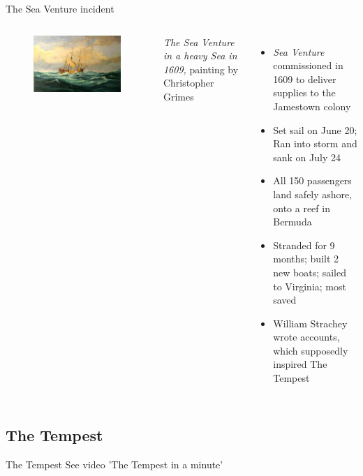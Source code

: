 \documentclass{beamer}
\begin{document}
\begin{frame}{The Sea Venture incident}
  \begin{columns}[c]
    \begin{figure}[htp]
      \begin{center}
        \centering
        \includegraphics[scale=0.29]{../Presentation/seaventure.jpg}
      \end{center}
    \end{figure}
    \footnotesize{\emph{The Sea Venture in a heavy Sea in 1609,} painting by Christopher Grimes}

  \begin{itemize}
  \item \emph{Sea Venture} commissioned in 1609 to deliver supplies to the Jamestown colony
  \item Set sail on June 20; Ran into storm and sank on July 24
  \item All 150 passengers land safely ashore, onto a reef in Bermuda
  \item Stranded for 9 months; built 2 new boats; sailed to Virginia; most saved
  \item William Strachey wrote accounts, which supposedly inspired The Tempest
  \end{itemize}
  \end{columns}
\end{frame}

\subsection{The Tempest}
\begin{frame}{The Tempest}
  See video 'The Tempest in a minute'
\end{frame}
\end{document}

